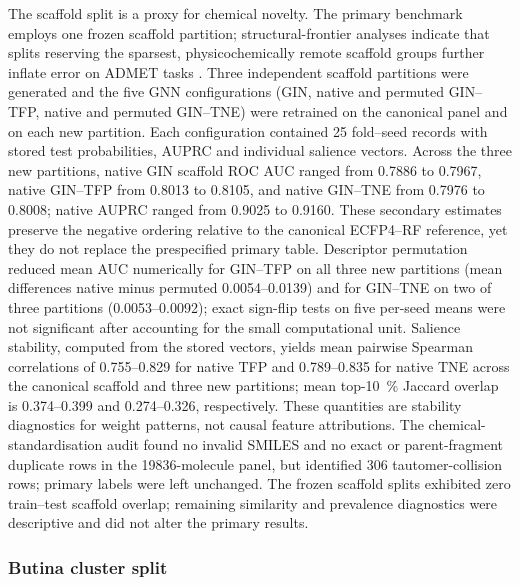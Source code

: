 \documentclass[11pt,a4paper]{article}
\begin{document}
The scaffold split is a proxy for chemical novelty. The primary benchmark employs one frozen scaffold partition; structural-frontier analyses indicate that splits reserving the sparsest, physicochemically remote scaffold groups further inflate error on ADMET tasks \citep{scaffold_frontier_2026}. Three independent scaffold partitions were generated and the five GNN configurations (GIN, native and permuted GIN--TFP, native and permuted GIN--TNE) were retrained on the canonical panel and on each new partition. Each configuration contained \num{25} fold--seed records with stored test probabilities, AUPRC and individual salience vectors. Across the three new partitions, native GIN scaffold ROC AUC ranged from \num{0.7886} to \num{0.7967}, native GIN--TFP from \num{0.8013} to \num{0.8105}, and native GIN--TNE from \num{0.7976} to \num{0.8008}; native AUPRC ranged from \num{0.9025} to \num{0.9160}. These secondary estimates preserve the negative ordering relative to the canonical ECFP4--RF reference, yet they do not replace the prespecified primary table. Descriptor permutation reduced mean AUC numerically for GIN--TFP on all three new partitions (mean differences native minus permuted \num{0.0054}--\num{0.0139}) and for GIN--TNE on two of three partitions (\num{0.0053}--\num{0.0092}); exact sign-flip tests on five per-seed means were not significant after accounting for the small computational unit. Salience stability, computed from the stored vectors, yields mean pairwise Spearman correlations of \num{0.755}--\num{0.829} for native TFP and \num{0.789}--\num{0.835} for native TNE across the canonical scaffold and three new partitions; mean top-\qty{10}{\percent} Jaccard overlap is \num{0.374}--\num{0.399} and \num{0.274}--\num{0.326}, respectively. These quantities are stability diagnostics for weight patterns, not causal feature attributions. The chemical-standardisation audit found no invalid SMILES and no exact or parent-fragment duplicate rows in the \num{19836}-molecule panel, but identified \num{306} tautomer-collision rows; primary labels were left unchanged. The frozen scaffold splits exhibited zero train--test scaffold overlap; remaining similarity and prevalence diagnostics were descriptive and did not alter the primary results.

\subsubsection{Butina cluster split}
\end{document}
